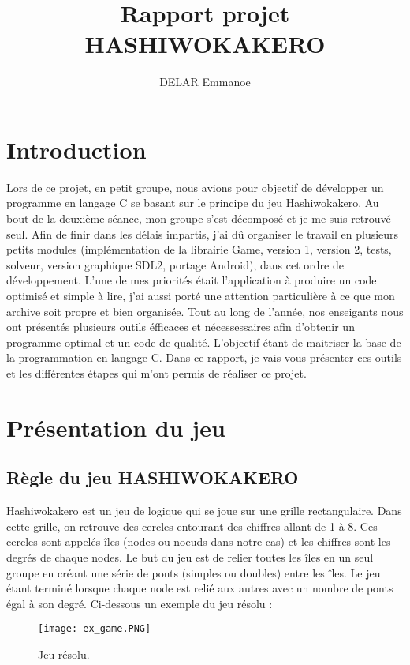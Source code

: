 \documentclass{article}
\title{Rapport projet HASHIWOKAKERO}
\author{DELAR Emmanoe}
\begin{document}
\maketitle
\newpage
\tableofcontents

\newpage
\section{Introduction}
Lors de ce projet, en petit groupe, nous avions pour objectif de d\'evelopper un programme en langage C se basant sur le principe du jeu Hashiwokakero. Au bout de la deuxi\`eme s\'eance, mon groupe s'est d\'ecompos\'e et je me suis retrouv\'e seul. 
\newline Afin de finir dans les d\'elais impartis, j'ai d\^u organiser le travail en plusieurs petits modules (impl\'ementation de la librairie Game, version 1, version 2, tests, solveur, version graphique SDL2, portage Android), dans cet ordre de d\'eveloppement. L'une de mes priorit\'es \'etait l'application \`a produire un code optimis\'e et simple \`a lire, j'ai aussi port\'e une attention particuli\`ere \`a ce que mon archive soit propre et bien organis\'ee. 
\newline
Tout au long de l'ann\'ee, nos enseigants nous ont pr\'esent\'es plusieurs outils \'efficaces et n\'ecessessaires afin d'obtenir un programme optimal et un code de qualit\'e. L'objectif \'etant de maitriser la base de la programmation en langage C.
\newline
Dans ce rapport, je vais vous pr\'esenter ces outils et les diff\'erentes \'etapes qui m'ont permis de r\'ealiser ce projet.

\section{Pr\'esentation du jeu}
	\subsection{R\`egle du jeu HASHIWOKAKERO}
	Hashiwokakero est un jeu de logique qui se joue sur une grille rectangulaire. Dans cette grille, on retrouve des cercles entourant des chiffres allant de 1 à 8. Ces cercles sont appel\'es \^iles (nodes ou noeuds dans notre cas) et les chiffres sont les degr\'es de chaque nodes. Le but du jeu est de relier toutes les \^iles en un seul groupe en cr\'eant une série de ponts (simples ou doubles) entre les \^iles. Le jeu \'etant termin\'e lorsque chaque node est reli\'e aux autres avec un nombre de ponts \'egal à son degr\'e.
	Ci-dessous un exemple du jeu r\'esolu :
	\begin{figure}[!h]
		\centering
		\texttt{[image: ex\_game.PNG]}
		\caption{ Jeu résolu.}
	\end{figure}
\end{document}
